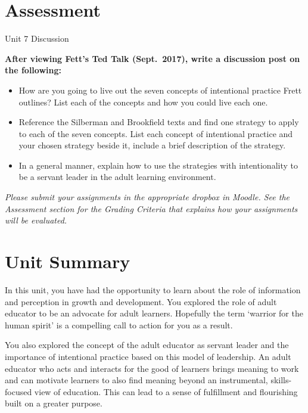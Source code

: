 \documentclass[
]{book}
\providecommand{\tightlist}{%
  \setlength{\itemsep}{0pt}\setlength{\parskip}{0pt}}
\begin{document}
\hypertarget{assessment-6}{%
\section*{Assessment}\label{assessment-6}}

\begin{assessment}
{Unit 7 Discussion}

\textbf{After viewing Fett's Ted Talk (Sept.~2017), write a discussion post on the
following:}

\begin{itemize}
\tightlist
\item
  How are you going to live out the seven concepts of intentional practice Frett outlines? List each of the concepts and how you could live each one.\\
\item
  Reference the Silberman and Brookfield texts and find one strategy to apply to each of the seven concepts. List each concept of intentional practice and your chosen strategy beside it, include a brief description of the strategy.\\
\item
  In a general manner, explain how to use the strategies with intentionality to be a servant leader in the adult learning environment. ~
\end{itemize}
\end{assessment}

\begin{caution}
\emph{Please submit your assignments in the appropriate dropbox in Moodle. See the Assessment section for the Grading Criteria that explains how your assignments will be evaluated.}
\end{caution}

\hypertarget{unit-summary}{%
\section*{Unit Summary}\label{unit-summary}}

In this unit, you have had the opportunity to learn about the role of information and perception in growth and development. You explored the role of adult educator to be an advocate for adult learners. Hopefully the term `warrior for the human spirit' is a compelling call to action for you as a result.

You also explored the concept of the adult educator as servant leader and the importance of intentional practice based on this model of leadership. An adult educator who acts and interacts for the good of learners brings meaning to work and can motivate learners to also find meaning beyond an instrumental, skills-focused view of education. This can lead to a sense of fulfillment and flourishing built on a greater purpose.
\end{document}
